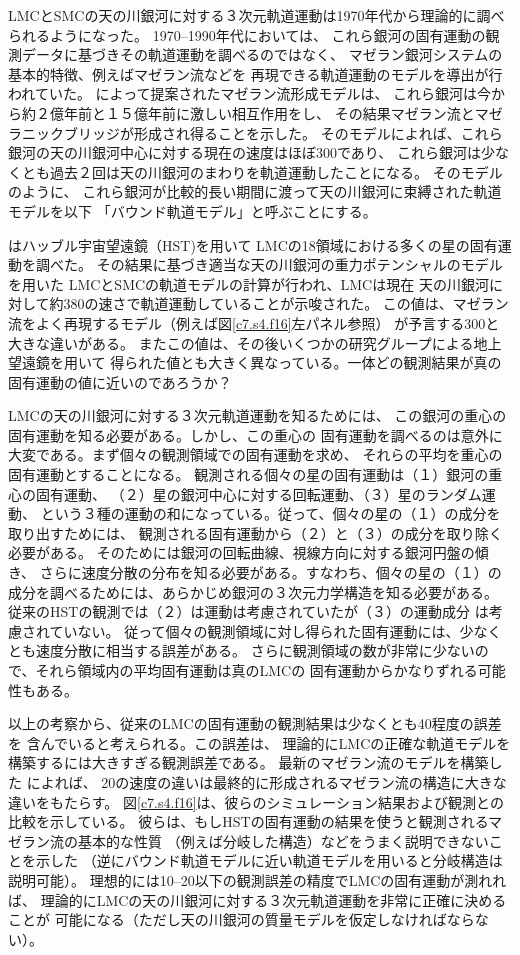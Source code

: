 LMCとSMCの天の川銀河に対する３次元軌道運動は1970年代から理論的に調べられるようになった。
1970--1990年代においては、
これら銀河の固有運動の観測データに基づきその軌道運動を調べるのではなく、
マゼラン銀河システムの基本的特徴、例えばマゼラン流などを
再現できる軌道運動のモデルを導出が行われていた。\citet{1996MNRAS.278..191G}
によって提案されたマゼラン流形成モデルは、
これら銀河は今から約２億年前と１５億年前に激しい相互作用をし、
その結果マゼラン流とマゼラニックブリッジが形成され得ることを示した。
そのモデルによれば、これら銀河の天の川銀河中心に対する現在の速度はほぼ300\kms であり、
これら銀河は少なくとも過去２回は天の川銀河のまわりを軌道運動したことになる。
そのモデルのように、
これら銀河が比較的長い期間に渡って天の川銀河に束縛された軌道モデルを以下
「バウンド軌道モデル」と呼ぶことにする。

\citet{2006ApJ...638..772K} はハッブル宇宙望遠鏡（HST)を用いて
LMCの18領域における多くの星の固有運動を調べた。
その結果に基づき適当な天の川銀河の重力ポテンシャルのモデルを用いた
LMCとSMCの軌道モデルの計算が行われ、LMCは現在
天の川銀河に対して約380\kms の速さで軌道運動していることが示唆された。
この値は、マゼラン流をよく再現するモデル（例えば図\ref{c7.s4.f16}左パネル参照）
が予言する300\kms と大きな違いがある。
またこの値は、その後いくつかの研究グループによる地上望遠鏡を用いて
得られた値とも大きく異なっている。一体どの観測結果が真の固有運動の値に近いのであろうか？

LMCの天の川銀河に対する３次元軌道運動を知るためには、
この銀河の重心の固有運動を知る必要がある。しかし、この重心の
固有運動を調べるのは意外に大変である。まず個々の観測領域での固有運動を求め、
それらの平均を重心の固有運動とすることになる。
観測される個々の星の固有運動は（１）銀河の重心の固有運動、
（２）星の銀河中心に対する回転運動、（３）星のランダム運動、
という３種の運動の和になっている。従って、個々の星の（１）の成分を取り出すためには、
観測される固有運動から（２）と（３）の成分を取り除く必要がある。
そのためには銀河の回転曲線、視線方向に対する銀河円盤の傾き、
さらに速度分散の分布を知る必要がある。すなわち、個々の星の（１）の
成分を調べるためには、あらかじめ銀河の３次元力学構造を知る必要がある。
従来のHSTの観測では（２）は運動は考慮されていたが（３）の運動成分
は考慮されていない。
従って個々の観測領域に対し得られた固有運動には、少なくとも速度分散に相当する誤差がある。
さらに観測領域の数が非常に少ないので、それら領域内の平均固有運動は真のLMCの
固有運動からかなりずれる可能性もある。

以上の考察から、従来のLMCの固有運動の観測結果は少なくとも40\kms 程度の誤差を
含んでいると考えられる。この誤差は、
理論的にLMCの正確な軌道モデルを構築するには大きすぎる観測誤差である。
最新のマゼラン流のモデルを構築した\citet{2012ApJ...750...36D} によれば、
20\kms の速度の違いは最終的に形成されるマゼラン流の構造に大きな違いをもたらす。
図\ref{c7.s4.f16}は、彼らのシミュレーション結果および観測との比較を示している。
彼らは、もしHSTの固有運動の結果を使うと観測されるマゼラン流の基本的な性質
（例えば分岐した構造）などをうまく説明できないことを示した
（逆にバウンド軌道モデルに近い軌道モデルを用いると分岐構造は説明可能）。
理想的には10--20\kms 以下の観測誤差の精度でLMCの固有運動が測れれば、
理論的にLMCの天の川銀河に対する３次元軌道運動を非常に正確に決めることが
可能になる（ただし天の川銀河の質量モデルを仮定しなければならない）。

